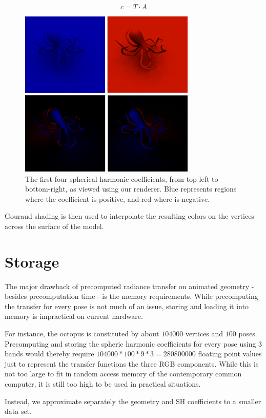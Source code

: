 \documentclass[annual]{acmsiggraph}
\begin{document}
\begin{equation}
	c = T \cdot A
\end{equation}

\begin{figure}[ht]
  \centering
  \includegraphics[width=3.3in]{images/octopusSH.png}
  \caption{The first four spherical harmonic coefficients, from top-left to bottom-right, as viewed using our renderer. Blue represents regions where the coefficient is positive, and red where is negative.}
\end{figure}

Gouraud shading is then used to interpolate the resulting colors on the vertices across the surface of the model.

\section{Storage}

The major drawback of precomputed radiance transfer on animated geometry - besides precomputation time - is the memory requirements. While precomputing the transfer for every pose is not much of an issue, storing and loading it into memory is impractical on current hardware.

For instance, the octopus is constituted by about $104000$ vertices and $100$ poses. Precomputing and storing the spheric harmonic coefficients for every pose using $3$ bands would thereby require $104000 * 100 * 9 * 3 = 280800000$ floating point values just to represent the transfer functions the three RGB components. While this is not too large to fit in random access memory of the contemporary common computer, it is still too high to be used in practical situations.

Instead, we approximate separately the geometry and SH coefficients to a smaller data set.
\end{document}

